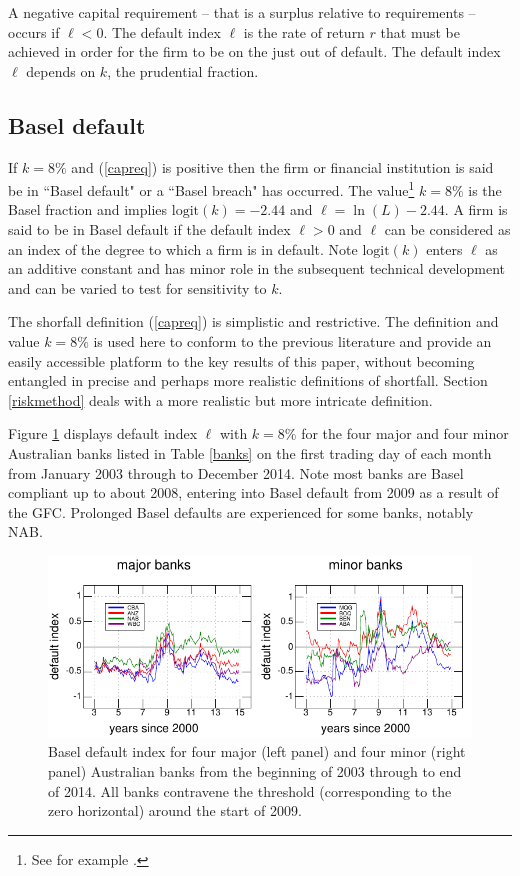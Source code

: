 \documentclass[authoryear]{elsarticle}
\newcommand{\logit}{\mathrm{logit}}
\newcommand{\eref}[1]{(\ref{#1})}
\newcommand{\fref}[1]{Figure \ref{#1}}
\newcommand{\sref}[1]{Section \ref{#1}}
\newcommand{\tref}[1]{Table \ref{#1}}
\begin{document}
A negative capital requirement -- that is a   surplus relative to requirements -- occurs  if $\ell<0$.   The default index $\ell$ is the rate of return $r$ that must be achieved in order for the firm to be on the just out of  default.   The default index $\ell$ depends on $k$, the prudential fraction. 

\subsection{Basel default}
If $k=8\%$ and  \eref{capreq} is positive then the  firm or financial institution is said be in ``Basel default" or a ``Basel breach" has occurred.  The value\footnote{See for example \cite{brownlees2015}.} $k=8\%$ is the Basel fraction and  implies $\logit( k)=-2.44$ and
$
\ell = \ln(L) - 2.44
$.   A firm is said to be in Basel default if the default index $\ell>0$ and $\ell$ can be considered as an index of the degree to which a firm is in default.  Note  $\logit(k)$ enters $\ell$ as an additive constant and has  minor role in the subsequent technical development and can be varied to test for sensitivity to $k$.  

The shorfall definition \eref{capreq} is simplistic and restrictive.   The definition and value $k=8\%$ is used here to conform to the previous literature and provide an easily accessible  platform to the key results of this paper,  without becoming entangled in precise and perhaps more realistic definitions of shortfall.   \sref{riskmethod} deals with a more realistic but more intricate definition.  

\fref{Bloglev} displays default index $\ell$ with $ k=8\%$ for the four major and four minor Australian banks listed in \tref{banks} on the first trading day of each month from January 2003  through to December 2014.  Note most banks are Basel compliant up to about 2008, entering into Basel default from 2009 as a result of the GFC. Prolonged Basel defaults are experienced for some banks, notably NAB.


\begin{figure}[htbp]
\begin{center}
\includegraphics{figures/fig2.pdf}\caption{Basel default index  for four major (left panel) and four minor (right panel) Australian banks from the beginning of 2003 through to end of 2014.  All banks contravene the threshold (corresponding to the zero horizontal) around the start of 2009.}\label{Bloglev}
\end{center}
\end{figure}
\end{document}
